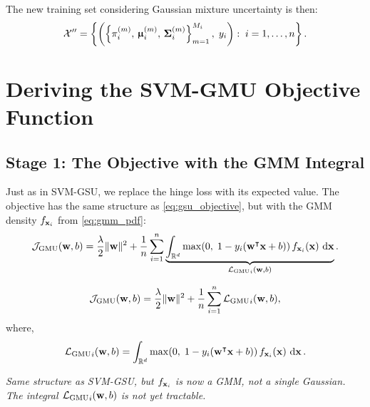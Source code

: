 \documentclass[11pt, letterpaper]{article}
\newcommand{\bSigma}{\vb{\Sigma}}
\newcommand{\bmu}{\boldsymbol{\upmu}}
\newcommand{\R}{\mathbb{R}}
\newcommand{\setX}{\mathcal{X}}
\newcommand{\loss}{\mathcal{L}}
\newcommand{\obj}{\mathcal{J}}
\begin{document}
The new training set considering Gaussian mixture uncertainty is then:
\begin{equation}\label{eq:gmu_training_set}
    \setX'' = \left\{ \left(\left\{\pi_i^{(m)},\, \bmu_i^{(m)},\, \bSigma_i^{(m)}\right\}_{m=1}^{M_i},\; y_i\right) :\; i = 1, \ldots, n \right\}.
\end{equation}

\section{Deriving the SVM-GMU Objective Function}\label{sec:gmu_objective}

\subsection{Stage 1: The Objective with the GMM Integral}

Just as in SVM-GSU, we replace the hinge loss with its expected value. The objective has the same structure as \cref{eq:gsu_objective}, but with the GMM density $f_{\vb{x}_i}$ from \cref{eq:gmm_pdf}:
\begin{equation}\label{eq:gmu_obj_integral}
    \obj_{\text{GMU}}(\vb{w}, b) = \frac{\lambda}{2}\|\vb{w}\|^2 + \frac{1}{n}\sum_{i=1}^{n} \underbrace{\int_{\R^d} \max\!\left(0,\; 1 - y_i\!\left(\vb{w}^{\intercal} \vb{x} + b\right)\right) f_{\vb{x}_i}(\vb{x})\, \dd{\vb{x}}}_{{\loss_{\text{GMU}}}_{i}(\vb{w}, b)}.
\end{equation}

\begin{statusbox}
\vspace{-0.5em}
\begin{equation*}
    \obj_{\text{GMU}}(\vb{w}, b) = \frac{\lambda}{2}\|\vb{w}\|^2 + \frac{1}{n}\sum_{i=1}^{n} {\loss_{\text{GMU}}}_{i}(\vb{w}, b),
\end{equation*}
where,
\begin{equation*}
    {\loss_{\text{GMU}}}_{i}(\vb{w}, b) = \int_{\R^d} \max\!\left(0,\; 1 - y_i(\vb{w}^{\intercal}\vb{x}+b)\right) f_{\vb{x}_i}(\vb{x})\,\dd{\vb{x}}.
\end{equation*}
\vspace{-1em}
\begin{center}\small
\emph{Same structure as SVM-GSU, but $f_{\vb{x}_i}$ is now a GMM, not a single Gaussian. The integral ${\loss_{\text{GMU}}}_{i}(\vb{w}, b)$ is not yet tractable.}
\end{center}
\end{statusbox}
\end{document}

